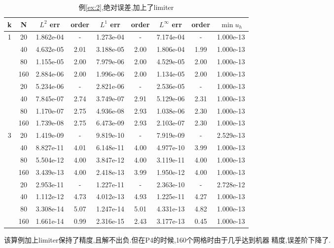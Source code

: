 \documentclass[a4paper, 11pt]{ctexart}
\numberwithin{equation}{section}
\numberwithin{figure}{section}
\begin{document}
\begin{table}[H]
  \centering
  \begin{tabular}{c|c|c|c|c|c|c|c|c} \toprule
 k  &  N &  $L^2$ err& order&$L^1$ err  &order & $L^\infty$ err&order& $\min u_h$ \\ \midrule
 \multirow{5}{*}{1}  &  20 & 1.862e-04 &  -   & 1.273e-04 &  -   & 7.174e-04 & -  & 1.000e-13\\
                     &  40 & 4.632e-05 & 2.01 & 3.188e-05 & 2.00 & 1.806e-04 & 1.99 & 1.000e-13\\
                     &  80 & 1.155e-05 & 2.00 & 7.979e-06 & 2.00 & 4.529e-05 & 2.00 & 1.000e-13\\
                     & 160 & 2.884e-06 & 2.00 & 1.996e-06 & 2.00 & 1.134e-05 & 2.00 & 1.000e-13\\ \midrule
 \multirow{5}{*}{2}  &  20 & 5.234e-06 &  -   & 2.821e-06 &  -   & 2.536e-05 & -  & 1.000e-13\\
                     &  40 & 7.845e-07 & 2.74 & 3.749e-07 & 2.91 & 5.129e-06 & 2.31 & 1.000e-13\\
                     &  80 & 1.170e-07 & 2.75 & 4.936e-08 & 2.93 & 1.038e-06 & 2.30 & 1.000e-13\\
                     & 160 & 1.739e-08 & 2.75 & 6.473e-09 & 2.93 & 2.103e-07 & 2.30 & 1.000e-13\\ \midrule
 \multirow{5}{*}{3}  &  20 & 1.419e-09 &  -   & 9.819e-10 &  -   & 7.919e-09 & -  & 2.529e-13\\
                     &  40 & 8.827e-11 & 4.01 & 6.148e-11 & 4.00 & 4.977e-10 & 3.99 & 1.000e-13\\
                     &  80 & 5.504e-12 & 4.00 & 3.847e-12 & 4.00 & 3.119e-11 & 4.00 & 1.000e-13\\
                     & 160 & 3.439e-13 & 4.00 & 2.418e-13 & 3.99 & 1.950e-12 & 4.00 & 1.000e-13\\ \midrule
 \multirow{5}{*}{4}  &  20 & 2.953e-11 &  -   & 1.227e-11 &  -   & 2.363e-10 & -  & 2.728e-12\\
                     &  40 & 1.112e-12 & 4.73 & 4.012e-13 & 4.93 & 1.225e-11 & 4.27 & 1.000e-13\\
                     &  80 & 3.308e-14 & 5.07 & 1.247e-14 & 5.01 & 4.331e-13 & 4.82 & 1.000e-13\\
                     & 160 & 1.661e-14 & 0.99 & 2.316e-15 & 2.43 & 3.177e-13 & 0.45 & 1.000e-13\\ \bottomrule
  \end{tabular}
  \caption{例\ref{ex:2},绝对误差,加上了limiter}
\end{table}
该算例加上limiter保持了精度,且解不出负.但在P4的时候,160个网格时由于几乎达到机器
精度,误差阶下降了.
\end{document}
